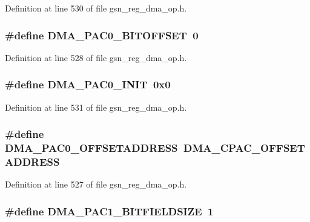 Definition at line 530 of file gsn\_\-reg\_\-dma\_\-op.h.

\hypertarget{a00547_a68c0d2ea155f8df33cf9fd72d16afb11}{
\subsubsection[{DMA\_\-PAC0\_\-BITOFFSET}]{\setlength{\rightskip}{0pt plus 5cm}\#define DMA\_\-PAC0\_\-BITOFFSET~0}}
\label{a00547_a68c0d2ea155f8df33cf9fd72d16afb11}


Definition at line 528 of file gsn\_\-reg\_\-dma\_\-op.h.

\hypertarget{a00547_af6f5ce2c38878637b9b4f267b6a37e97}{
\subsubsection[{DMA\_\-PAC0\_\-INIT}]{\setlength{\rightskip}{0pt plus 5cm}\#define DMA\_\-PAC0\_\-INIT~0x0}}
\label{a00547_af6f5ce2c38878637b9b4f267b6a37e97}


Definition at line 531 of file gsn\_\-reg\_\-dma\_\-op.h.

\hypertarget{a00547_a63df217e6567438f3faca9f75ffb0241}{
\subsubsection[{DMA\_\-PAC0\_\-OFFSETADDRESS}]{\setlength{\rightskip}{0pt plus 5cm}\#define DMA\_\-PAC0\_\-OFFSETADDRESS~DMA\_\-CPAC\_\-OFFSETADDRESS}}
\label{a00547_a63df217e6567438f3faca9f75ffb0241}


Definition at line 527 of file gsn\_\-reg\_\-dma\_\-op.h.

\hypertarget{a00547_a3755ff2c8c120d396297191509f57143}{
\subsubsection[{DMA\_\-PAC1\_\-BITFIELDSIZE}]{\setlength{\rightskip}{0pt plus 5cm}\#define DMA\_\-PAC1\_\-BITFIELDSIZE~1}}
\label{a00547_a3755ff2c8c120d396297191509f57143}


